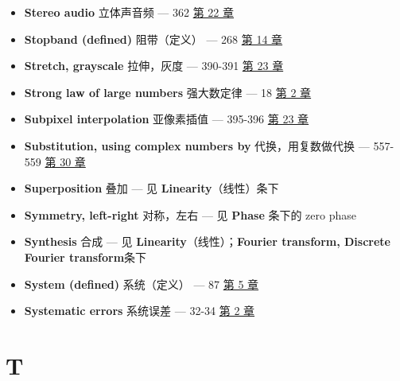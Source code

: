 \begin{itemize}
\item
  \textbf{Stereo audio} 立体声音频 --- 362 
  \hyperref[ch-22]{第 22 章}
\item
  \textbf{Stopband (defined)} 阻带（定义） --- 268 
  \hyperref[ch-14]{第 14 章}
\item
  \textbf{Stretch, grayscale} 拉伸，灰度 --- 390-391 
  \hyperref[ch-23]{第 23 章}
\item
  \textbf{Strong law of large numbers} 强大数定律 --- 18 
  \hyperref[ch-02]{第 2 章}
\item
  \textbf{Subpixel interpolation} 亚像素插值 --- 395-396 
  \hyperref[ch-23]{第 23 章}
\item
  \textbf{Substitution, using complex numbers by} 代换，用复数做代换 ---
  557-559  \hyperref[ch-30]{第 30 章}
\item
  \textbf{Superposition} 叠加 --- 见 \textbf{Linearity}（线性）条下
\item
  \textbf{Symmetry, left-right} 对称，左右 --- 见 \textbf{Phase} 条下的
  zero phase
\item
  \textbf{Synthesis} 合成 --- 见
  \textbf{Linearity}（线性）；\textbf{Fourier transform, Discrete
  Fourier transform}条下
\item
  \textbf{System (defined)} 系统（定义） --- 87 
  \hyperref[ch-05]{第 5 章}
\item
  \textbf{Systematic errors} 系统误差 --- 32-34 
  \hyperref[ch-02]{第 2 章}
\end{itemize}

\section{T}

